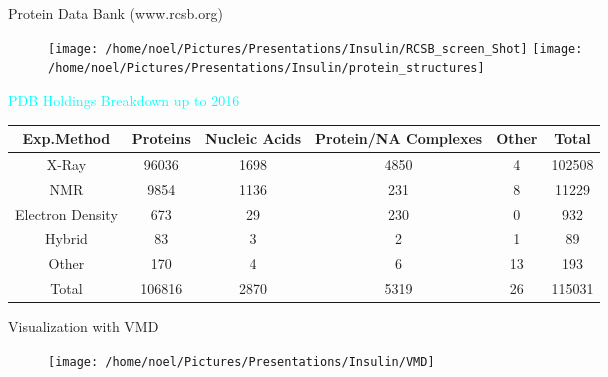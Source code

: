 \documentclass{beamer}
\begin{document}
\begin{frame}{Protein Data Bank (www.rcsb.org)}
          \begin{center}
          \begin{figure}
           \texttt{[image: /home/noel/Pictures/Presentations/Insulin/RCSB\_screen\_Shot]}
           \texttt{[image: /home/noel/Pictures/Presentations/Insulin/protein\_structures]}
          \end{figure}
          \textcolor{cyan}{\small PDB Holdings Breakdown up to 2016}
          {\tiny
          \begin{tabular}{| c | c | c | c | c | c | } \hline
               Exp.Method & Proteins & Nucleic Acids & Protein/NA Complexes & Other & Total \\
               \hline
               X-Ray & 96036 & 1698 & 4850 & 4 & 102508 \\
               NMR & 9854 & 1136 & 231 & 8 & 11229 \\
               Electron Density & 673 & 29 & 230 & 0 & 932 \\
               Hybrid & 83 & 3 & 2 & 1 & 89 \\
               Other & 170 & 4 & 6 & 13 & 193 \\
               Total & 106816 & 2870 & 5319 & 26 & 115031 \\
              \hline
          \end{tabular}
          }
          \end{center}
\end{frame}
\begin{frame}{Visualization with VMD}
  \begin{figure}
    \texttt{[image: /home/noel/Pictures/Presentations/Insulin/VMD]}
  \end{figure}
\end{frame}
\end{document}
